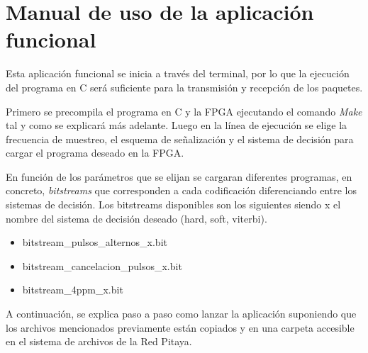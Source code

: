 
\pagestyle{fancy}
\fancyhead[LE,RO]{\thepage}
\fancyhead[LO]{\nouppercase{\rightmark}}

\chapter{Manual de uso de la aplicación funcional}



Esta aplicación funcional se inicia a través del terminal, por lo que la ejecución 
del programa en C será suficiente para la transmisión y recepción de los paquetes.

Primero se precompila el programa en C y la FPGA ejecutando el comando \textit{Make} tal 
y como se explicará más adelante. Luego en la línea de ejecución se elige la frecuencia
de muestreo, el esquema de señalización y el sistema de decisión para cargar el 
programa deseado en la FPGA.

En función de los parámetros que se elijan se cargaran diferentes programas, en concreto, 
\textit{bitstreams} que corresponden a cada codificación diferenciando entre los sistemas
de decisión. Los bitstreams disponibles son los siguientes siendo x el nombre del 
sistema de decisión deseado (hard, soft, viterbi).

\begin{itemize}
    \item bitstream\_pulsos\_alternos\_x.bit
    \item bitstream\_cancelacion\_pulsos\_x.bit
    \item bitstream\_4ppm\_x.bit
\end{itemize}

A continuación, se explica paso a paso como lanzar la aplicación suponiendo que los 
archivos mencionados previamente están copiados y en una carpeta accesible en el 
sistema de archivos de la Red Pitaya. 

